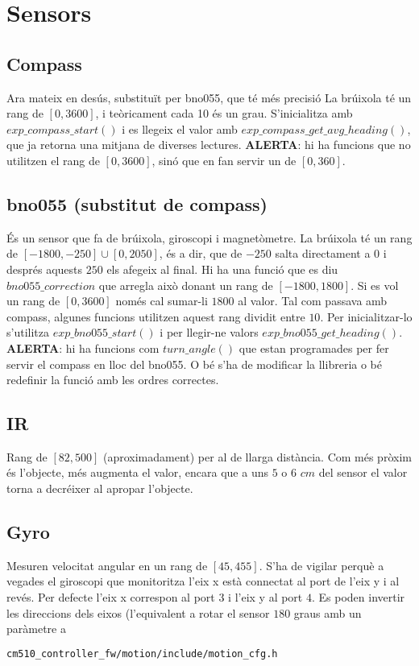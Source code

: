 \documentclass{article}
\begin{document}
\section{Sensors}
\subsection{Compass} Ara mateix en desús, substituït per bno055, que té més precisió La brúixola té un rang de $[0, 3600]$, i teòricament cada 10 és un grau. S'inicialitza amb $exp\_compass\_start()$ i es llegeix el valor amb $exp\_compass\_get\_avg\_heading()$, que ja retorna una mitjana de diverses lectures. \textbf{ALERTA}: hi ha funcions que no utilitzen el rang de $[0, 3600]$, sinó que en fan servir un de $[0, 360]$.
\subsection{bno055 (substitut de compass)}
És un sensor que fa de brúixola, giroscopi i magnetòmetre. La brúixola té un rang de $[-1800, -250]\cup [0, 2050]$, és a dir, que de $-250$ salta directament a $0$ i després aquests $250$ els afegeix al final. Hi ha una funció que es diu $bno055\_correction$ que arregla això donant un rang de $[-1800, 1800]$. Si es vol un rang de $[0, 3600]$ només cal sumar-li $1800$ al valor. Tal com passava amb compass, algunes funcions utilitzen aquest rang dividit entre $10$. Per inicialitzar-lo s'utilitza $exp\_bno055\_start()$ i per llegir-ne valors $exp\_bno055\_get\_heading()$. \textbf{ALERTA}: hi ha funcions com $turn\_angle()$ que estan programades per fer servir el compass en lloc del bno055. O bé s'ha de modificar la llibreria o bé redefinir la funció amb les ordres correctes.

\subsection{IR}
Rang de $[82, 500]$ (aproximadament) per al de llarga distància. Com més pròxim és l'objecte, més augmenta el valor, encara que a uns $5$ o $6$ $cm$ del sensor el valor torna a decréixer al apropar l'objecte.

\subsection{Gyro} 
Mesuren velocitat angular en un rang de $[45, 455]$. S'ha de vigilar perquè a vegades el giroscopi que monitoritza l'eix x està connectat al port de l'eix y i al revés. Per defecte l'eix x correspon al port $3$ i l'eix y al port $4$. Es poden invertir les direccions dels eixos (l'equivalent a rotar el sensor $180$ graus amb un paràmetre a 
\begin{lstlisting}[language=bash]
cm510_controller_fw/motion/include/motion_cfg.h
\end{lstlisting}
\end{document}
